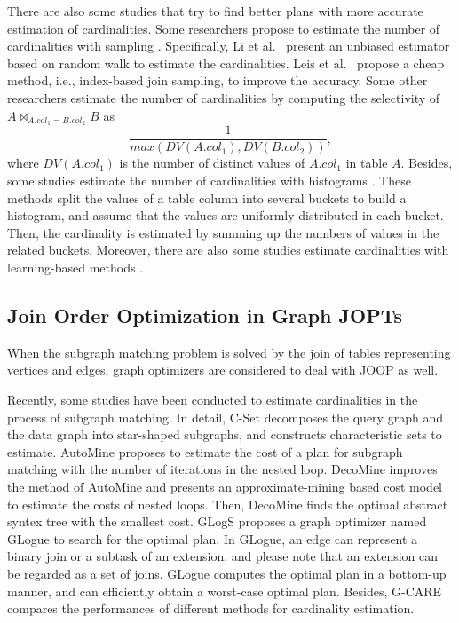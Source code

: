 \documentclass[sigconf, nonacm]{acmart}
\begin{document}
There are also some studies that try to find better plans with more accurate estimation of cardinalities.
Some researchers propose to estimate the number of cardinalities with sampling \cite{index-based-join-sampling,ripple-join,wanderjoin,index-based-join-sampling}.
Specifically, Li et al.~\cite{wanderjoin} present an unbiased estimator based on random walk to estimate the cardinalities.
Leis et al.~\cite{index-based-join-sampling} propose a cheap method, i.e., index-based join sampling, to improve the accuracy.
Some other researchers \cite{selinger,postgres-row-estimation} estimate the number of cardinalities by computing the selectivity of $A \bowtie_{A.col_1 = B.col_2} B$ as 
\begin{equation*}
    \frac{1}{max(DV(A.col_1), DV(B.col_2))},
\end{equation*}
where $DV(A.col_1)$ is the number of distinct values of $A.col_1$ in table $A$.
Besides, some studies estimate the number of cardinalities with histograms \cite{histogram,postgres-row-estimation}.
These methods split the values of a table column into several buckets to build a histogram, and assume that the values are uniformly distributed in each bucket.
Then, the cardinality is estimated by summing up the numbers of values in the related buckets.
Moreover, there are also some studies estimate cardinalities with learning-based methods \cite{learning-based-estimation-1,learning-based-estimation-2,learning-based-estimation-3,learning-based-estimation-4}.


\subsection{Join Order Optimization in Graph JOPTs}
\label{sec:related-work:gopt}
When the subgraph matching problem is solved by the join of tables representing vertices and edges, graph optimizers are considered to deal with JOOP as well.

Recently, some studies have been conducted to estimate cardinalities in the process of subgraph matching.
In detail, 
C-Set \cite{cset} decomposes the query graph and the data graph into star-shaped subgraphs, and constructs characteristic sets to estimate.
AutoMine \cite{AutoMine} proposes to estimate the cost of a plan for subgraph matching with the number of iterations in the nested loop.
DecoMine \cite{DecoMine} improves the method of AutoMine and presents an approximate-mining based cost model to estimate the costs of nested loops.
Then, DecoMine finds the optimal abstract syntex tree with the smallest cost.
GLogS \cite{GLogS} proposes a graph optimizer named GLogue to search for the optimal plan.
In GLogue, an edge can represent a binary join or a subtask of an extension, and please note that an extension can be regarded as a set of joins.
GLogue computes the optimal plan in a bottom-up manner, and can efficiently obtain a worst-case optimal plan.
Besides, G-CARE \cite{gcare} compares the performances of different methods for cardinality estimation.
\end{document}
